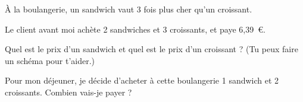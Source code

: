 \`A la boulangerie, un sandwich vaut 3 fois plus cher qu'un croissant.

Le client avant moi achète 2 sandwiches et 3 croissants, et paye 6,39~\textgreek{\euro}.

\begin{myenumerate}
	\item Quel est le prix d'un sandwich et quel est le prix d'un
          croissant ? (Tu peux faire un schéma pour t'aider.)
	\item Pour mon déjeuner, je décide d'acheter à cette
          boulangerie 1 sandwich et 2 croissants. Combien vais-je
          payer ?
\end{myenumerate}